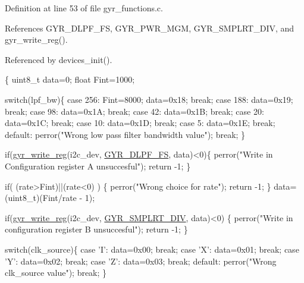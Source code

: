 Definition at line 53 of file gyr\-\_\-functions.\-c.



References G\-Y\-R\-\_\-\-D\-L\-P\-F\-\_\-\-F\-S, G\-Y\-R\-\_\-\-P\-W\-R\-\_\-\-M\-G\-M, G\-Y\-R\-\_\-\-S\-M\-P\-L\-R\-T\-\_\-\-D\-I\-V, and gyr\-\_\-write\-\_\-reg().



Referenced by devices\-\_\-init().


\begin{DoxyCode}
\{ 
  uint8\_t data=0;
  \textcolor{keywordtype}{float} Fint=1000;

  \textcolor{keywordflow}{switch}(lpf\_bw)\{
    \textcolor{keywordflow}{case} 256:
      Fint=8000;
      data=0x18;
      \textcolor{keywordflow}{break};
    \textcolor{keywordflow}{case} 188:
      data=0x19;
      \textcolor{keywordflow}{break};
    \textcolor{keywordflow}{case} 98:
      data=0x1A;
      \textcolor{keywordflow}{break};
    \textcolor{keywordflow}{case} 42:
      data=0x1B;
      \textcolor{keywordflow}{break};
    \textcolor{keywordflow}{case} 20:
      data=0x1C;
      \textcolor{keywordflow}{break};
    \textcolor{keywordflow}{case} 10:
      data=0x1D;
      \textcolor{keywordflow}{break};
    \textcolor{keywordflow}{case} 5:
      data=0x1E;
      \textcolor{keywordflow}{break};
    \textcolor{keywordflow}{default}:
      perror(\textcolor{stringliteral}{"Wrong low pass filter bandwidth value"});
      \textcolor{keywordflow}{break};
  \}
  
  \textcolor{keywordflow}{if}(\hyperlink{group__gyr_ga3eba167b8ab0614bfe7bafeae8b5570d}{gyr\_write\_reg}(i2c\_dev, \hyperlink{imu__regs_8h_a78908b66de8b46d12895e7cb66af6f5c}{GYR\_DLPF\_FS}, data)<0)\{
    perror(\textcolor{stringliteral}{"Write in Configuration register A unsuccesful"});
    \textcolor{keywordflow}{return} -1;
  \}

  \textcolor{keywordflow}{if}( (rate>Fint)||(rate<0) )
  \{
    perror(\textcolor{stringliteral}{"Wrong choice for rate"});
    \textcolor{keywordflow}{return} -1;
  \}
  data=(uint8\_t)(Fint/rate - 1);
  
  \textcolor{keywordflow}{if}(\hyperlink{group__gyr_ga3eba167b8ab0614bfe7bafeae8b5570d}{gyr\_write\_reg}(i2c\_dev, \hyperlink{imu__regs_8h_a04a18568e6e39825c98be5ec2976bec4}{GYR\_SMPLRT\_DIV}, data)<0)
      \{
    perror(\textcolor{stringliteral}{"Write in configuration register B unsuccesful"});
    \textcolor{keywordflow}{return} -1;
  \}
      
  \textcolor{keywordflow}{switch}(clk\_source)\{
    \textcolor{keywordflow}{case} \textcolor{charliteral}{'I'}:
      data=0x00;
      \textcolor{keywordflow}{break};
    \textcolor{keywordflow}{case} \textcolor{charliteral}{'X'}:
      data=0x01;
      \textcolor{keywordflow}{break};
    \textcolor{keywordflow}{case} \textcolor{charliteral}{'Y'}:
      data=0x02;
      \textcolor{keywordflow}{break};
    \textcolor{keywordflow}{case} \textcolor{charliteral}{'Z'}:
      data=0x03;
      \textcolor{keywordflow}{break};
    \textcolor{keywordflow}{default}:
      perror(\textcolor{stringliteral}{"Wrong clk\_source value"});
      \textcolor{keywordflow}{break};
  \}
      

\end{DoxyCode}
